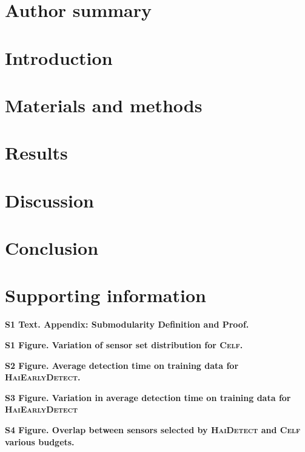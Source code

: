 \documentclass[10pt,letterpaper]{article}
\newcommand{\alg}{\textsc{HaiDetect}\xspace}
\newcommand{\algt}{\textsc{HaiEarlyDetect}\xspace}
\newcommand{\celf}{\textsc{Celf}\xspace}
\newcommand{\forAnil}[1]{{\color{blue} #1}}
\begin{document}
\section*{Author summary}



\linenumbers

\section*{Introduction}



\section*{Materials and methods}








\section*{Results}







\section*{Discussion}



\section*{Conclusion}


\section*{Supporting information}

\par \noindent \textbf{S1 Text. Appendix: Submodularity Definition and Proof.}
\par \noindent \textbf{S1 Figure. Variation of sensor set distribution for \celf. }
\par \noindent \textbf{S2 Figure. Average detection time on training data for \algt.}
\par \noindent \textbf{S3 Figure. Variation in average detection time on training data for \algt}
\par \noindent \textbf{S4 Figure. Overlap between sensors selected by \alg and \celf various budgets.}
\end{document}
